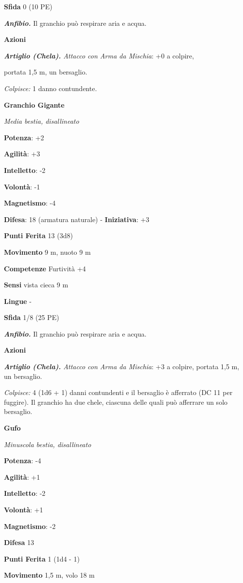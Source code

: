 \begin{multicols}{2}
\textbf{Sfida} 0 (10 PE)

\emph{\textbf{Anfibio.}} Il granchio può respirare aria e acqua.

\textbf{Azioni}

\emph{\textbf{Artiglio (Chela).} Attacco con Arma da Mischia}: +0 a
colpire,

portata 1,5 m, un bersaglio.

\emph{Colpisce:} 1 danno contundente.

\textbf{Granchio Gigante}

\emph{Media bestia, disallineato}

\textbf{Potenza}: +2

\textbf{Agilità}: +3

\textbf{Intelletto}: -2

\textbf{Volontà}: -1

\textbf{Magnetismo}: -4

\textbf{Difesa}: 18 (armatura naturale) - \textbf{Iniziativa}: +3

\textbf{Punti Ferita} 13 (3d8)

\textbf{Movimento} 9 m, nuoto 9 m

\textbf{Competenze} Furtività +4

\textbf{Sensi} vista cieca 9 m

\textbf{Lingue} -

\textbf{Sfida} 1/8 (25 PE)

\emph{\textbf{Anfibio.}} Il granchio può respirare aria e acqua.

\textbf{Azioni}

\emph{\textbf{Artiglio (Chela).} Attacco con Arma da Mischia}: +3 a
colpire, portata 1,5 m, un bersaglio.

\emph{Colpisce:} 4 (1d6 + 1) danni contundenti e il bersaglio è
afferrato (DC 11 per fuggire). Il granchio ha due chele, ciascuna delle
quali può afferrare un solo bersaglio.

\textbf{Gufo}

\emph{Minuscola bestia, disallineato}

\textbf{Potenza}: -4

\textbf{Agilità}: +1

\textbf{Intelletto}: -2

\textbf{Volontà}: +1

\textbf{Magnetismo}: -2

\textbf{Difesa} 13

\textbf{Punti Ferita} 1 (1d4 - 1)

\textbf{Movimento} 1,5 m, volo 18 m


\end{multicols}
